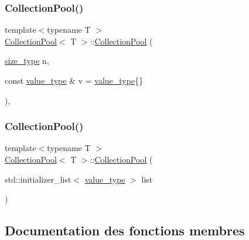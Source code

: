 \subsubsection{\texorpdfstring{Collection\+Pool()}{CollectionPool()}\hspace{0.1cm}{\footnotesize\ttfamily [2/3]}}
{\footnotesize\ttfamily template$<$typename T $>$ \\
\hyperlink{class_collection_pool}{Collection\+Pool}$<$ T $>$\+::\hyperlink{class_collection_pool}{Collection\+Pool} (\begin{DoxyParamCaption}\item[{\hyperlink{class_collection_a3f8b024f587aa20be530866da30948c4}{size\+\_\+type}}]{n,  }\item[{const \hyperlink{class_collection_pool_a018a408f2c2bcdf2b542141dbc1d1c17}{value\+\_\+type} \&}]{v = {\ttfamily \hyperlink{class_collection_pool_a018a408f2c2bcdf2b542141dbc1d1c17}{value\+\_\+type}\{\}} }\end{DoxyParamCaption})\hspace{0.3cm}{\ttfamily [inline]}, {\ttfamily [explicit]}}

\mbox{\label{class_collection_pool_a20a624365d44f3b3ae562022d363235b}} 
\subsubsection{\texorpdfstring{Collection\+Pool()}{CollectionPool()}\hspace{0.1cm}{\footnotesize\ttfamily [3/3]}}
{\footnotesize\ttfamily template$<$typename T $>$ \\
\hyperlink{class_collection_pool}{Collection\+Pool}$<$ T $>$\+::\hyperlink{class_collection_pool}{Collection\+Pool} (\begin{DoxyParamCaption}\item[{std\+::initializer\+\_\+list$<$ \hyperlink{class_collection_pool_a018a408f2c2bcdf2b542141dbc1d1c17}{value\+\_\+type} $>$}]{list }\end{DoxyParamCaption})\hspace{0.3cm}{\ttfamily [inline]}}



\subsection{Documentation des fonctions membres}
\mbox{\label{class_collection_pool_ae13d478a26554da9211db064285c7b0b}} 
